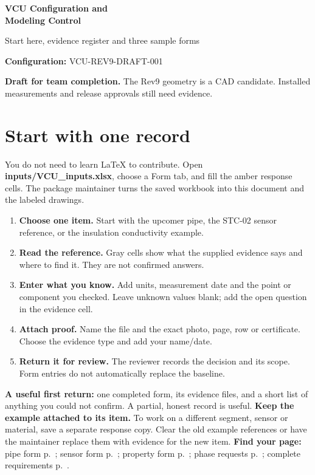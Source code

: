 \documentclass[11pt]{article}
\newcommand{\notebox}[1]{\par\noindent\colorbox{amber}{\parbox{\dimexpr\linewidth-2\fboxsep\relax}{#1}}\par}
\begin{document}
{\color{navy}\LARGE\bfseries VCU Configuration and\\[4pt] Modeling Control}\par
{\large Start here, evidence register and three sample forms}\par

\textbf{Configuration:} VCU-REV9-DRAFT-001\par
\notebox{\textbf{Draft for team completion.} The Rev9 geometry is a CAD candidate. Installed measurements and release approvals still need evidence.}
\section*{Start with one record}
You do not need to learn LaTeX to contribute. Open \textbf{inputs/VCU\_inputs.xlsx}, choose a Form tab, and fill the amber response cells. The package maintainer turns the saved workbook into this document and the labeled drawings.
\begin{enumerate}
\item \textbf{Choose one item.} Start with the upcomer pipe, the STC-02 sensor reference, or the insulation conductivity example.
\item \textbf{Read the reference.} Gray cells show what the supplied evidence says and where to find it. They are not confirmed answers.
\item \textbf{Enter what you know.} Add units, measurement date and the point or component you checked. Leave unknown values blank; add the open question in the evidence cell.
\item \textbf{Attach proof.} Name the file and the exact photo, page, row or certificate. Choose the evidence type and add your name/date.
\item \textbf{Return it for review.} The reviewer records the decision and its scope. Form entries do not automatically replace the baseline.
\end{enumerate}
\textbf{A useful first return:} one completed form, its evidence files, and a short list of anything you could not confirm. A partial, honest record is useful.
\textbf{Keep the example attached to its item.} To work on a different segment, sensor or material, save a separate response copy. Clear the old example references or have the maintainer replace them with evidence for the new item.
\textbf{Find your page:} pipe form p.~\pageref{form-pipe}; sensor form p.~\pageref{form-sensor}; property form p.~\pageref{form-material}; phase requests p.~\pageref{phase-requests}; complete requirements p.~\pageref{requirements}.
\end{document}
